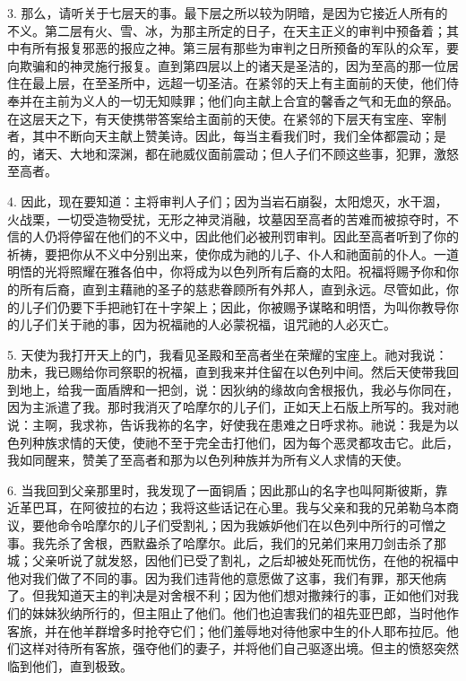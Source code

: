 3. 那么，请听关于七层天的事。最下层之所以较为阴暗，是因为它接近人所有的不义。第二层有火、雪、冰，为那主所定的日子，在天主正义的审判中预备着；其中有所有报复邪恶的报应之神。第三层有那些为审判之日所预备的军队的众军，要向欺骗和的神灵施行报复。直到第四层以上的诸天是圣洁的，因为至高的那一位居住在最上层，在至圣所中，远超一切圣洁。在紧邻的天上有主面前的天使，他们侍奉并在主前为义人的一切无知赎罪；他们向主献上合宜的馨香之气和无血的祭品。在这层天之下，有天使携带答案给主面前的天使。在紧邻的下层天有宝座、宰制者，其中不断向天主献上赞美诗。因此，每当主看我们时，我们全体都震动；是的，诸天、大地和深渊，都在祂威仪面前震动；但人子们不顾这些事，犯罪，激怒至高者。\par

4. 因此，现在要知道：主将审判人子们；因为当岩石崩裂，太阳熄灭，水干涸，火战栗，一切受造物受扰，无形之神灵消融，坟墓因至高者的苦难而被掠夺时，不信的人仍将停留在他们的不义中，因此他们必被刑罚审判。因此至高者听到了你的祈祷，要把你从不义中分别出来，使你成为祂的儿子、仆人和祂面前的仆人。一道明悟的光将照耀在雅各伯中，你将成为以色列所有后裔的太阳。祝福将赐予你和你的所有后裔，直到主藉祂的圣子的慈悲眷顾所有外邦人，直到永远。尽管如此，你的儿子们仍要下手把祂钉在十字架上；因此，你被赐予谋略和明悟，为叫你教导你的儿子们关于祂的事，因为祝福祂的人必蒙祝福，诅咒祂的人必灭亡。\par

5. 天使为我打开天上的门，我看见圣殿和至高者坐在荣耀的宝座上。祂对我说：肋未，我已赐给你司祭职的祝福，直到我来并住留在以色列中间。然后天使带我回到地上，给我一面盾牌和一把剑，说：因狄纳的缘故向舍根报仇，我必与你同在，因为主派遣了我。那时我消灭了哈摩尔的儿子们，正如天上石版上所写的。我对祂说：主啊，我求祢，告诉我祢的名字，好使我在患难之日呼求祢。祂说：我是为以色列种族求情的天使，使祂不至于完全击打他们，因为每个恶灵都攻击它。此后，我如同醒来，赞美了至高者和那为以色列种族并为所有义人求情的天使。\par

6. 当我回到父亲那里时，我发现了一面铜盾；因此那山的名字也叫阿斯彼斯，靠近革巴耳，在阿彼拉的右边；我将这些话记在心里。我与父亲和我的兄弟勒乌本商议，要他命令哈摩尔的儿子们受割礼；因为我嫉妒他们在以色列中所行的可憎之事。我先杀了舍根，西默盎杀了哈摩尔。此后，我们的兄弟们来用刀剑击杀了那城；父亲听说了就发怒，因他们已受了割礼，之后却被处死而忧伤，在他的祝福中他对我们做了不同的事。因为我们违背他的意愿做了这事，我们有罪，那天他病了。但我知道天主的判决是对舍根不利；因为他们想对撒辣行的事，正如他们对我们的妹妹狄纳所行的，但主阻止了他们。他们也迫害我们的祖先亚巴郎，当时他作客旅，并在他羊群增多时抢夺它们；他们羞辱地对待他家中生的仆人耶布拉厄。他们这样对待所有客旅，强夺他们的妻子，并将他们自己驱逐出境。但主的愤怒突然临到他们，直到极致。\par

